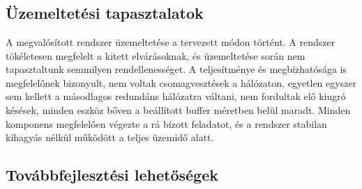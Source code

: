 \chapter{\FurtherDevelopment}

\section{Üzemeltetési tapasztalatok}

A megvalósított rendszer üzemeltetése a tervezett módon történt. A rendszer
tökéletesen megfelelt a kitett elvárásoknak, és üzemeltetése során nem
tapasztaltunk semmilyen rendellenességet. A teljesítménye és megbízhatósága is megfelelőnek bizonyult, nem 
voltak csomagvesztések a hálózaton, egyetlen egyszer sem kellett a másodlagos redundáns hálózatra
váltani, nem fordultak elő kiugró késések, minden eszköz bőven a beállított buffer méretben belül maradt.
Minden komponens megfelelően végezte a rá bízott feladatot, és a rendszer
stabilan kihagyás nélkül működött a teljes üzemidő alatt. 





 
 


\section{Továbbfejlesztési lehetőségek}


